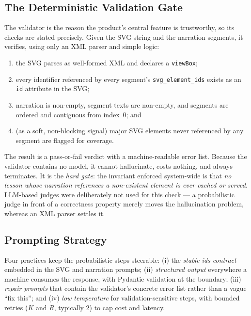 \subsection{The Deterministic Validation Gate}
\label{sec:gate}

The validator is the reason the product's central feature is trustworthy, so
its checks are stated precisely. Given the SVG string and the narration
segments, it verifies, using only an XML parser and simple logic:

\begin{enumerate}
  \item the SVG parses as well-formed XML and declares a \texttt{viewBox};
  \item every identifier referenced by every segment's
        \texttt{svg\_element\_ids} exists as an \texttt{id} attribute in the
        SVG;
  \item narration is non-empty, segment texts are non-empty, and segments
        are ordered and contiguous from index~0; and
  \item (as a soft, non-blocking signal) major SVG elements never referenced
        by any segment are flagged for coverage.
\end{enumerate}

The result is a pass-or-fail verdict with a machine-readable error list.
Because the validator contains no model, it cannot hallucinate, costs
nothing, and always terminates. It is the \emph{hard gate}: the invariant
enforced system-wide is that \emph{no lesson whose narration references a
non-existent element is ever cached or served}. LLM-based judges were
deliberately not used for this check --- a probabilistic judge in front of a
correctness property merely moves the hallucination problem, whereas an XML
parser settles it.

\subsection{Prompting Strategy}

Four practices keep the probabilistic steps steerable: (i) the \emph{stable
ids contract} embedded in the SVG and narration prompts; (ii)
\emph{structured output} everywhere a machine consumes the response, with
Pydantic validation at the boundary; (iii) \emph{repair prompts} that contain
the validator's concrete error list rather than a vague ``fix this''; and
(iv) \emph{low temperature} for validation-sensitive steps, with bounded
retries ($K$ and $R$, typically 2) to cap cost and latency.

